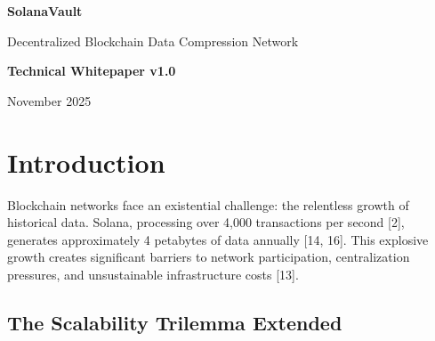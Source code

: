 \documentclass[12pt,a4paper]{article}
\begin{document}
\begin{titlepage}
\centering
\vspace*{2cm}
{\Huge\bfseries\color{vaultblue} SolanaVault\par}
\vspace{0.5cm}
{\Large Decentralized Blockchain Data Compression Network\par}
\vspace{2cm}
{\large\textbf{Technical Whitepaper v1.0}\par}
\vspace{1cm}
{\large November 2025\par}
\vspace{3cm}
\begin{abstract}
\noindent SolanaVault introduces a novel decentralized network architecture that combines advanced multi-stage compression algorithms with Byzantine Fault Tolerant consensus [4] to achieve 15-25:1 compression ratios on blockchain data. The protocol establishes a self-sustaining economic model through micro-token payments, enabling infrastructure operators to earn revenue while users benefit from dramatically reduced storage costs. This paper presents the technical architecture, tokenomics, and utility mechanisms that position SolanaVault as critical infrastructure for blockchain scalability.
\end{abstract}
\vfill
\end{titlepage}

\tableofcontents
\newpage

\section{Introduction}

Blockchain networks face an existential challenge: the relentless growth of historical data. Solana, processing over 4,000 transactions per second [2], generates approximately 4 petabytes of data annually [14, 16]. This explosive growth creates significant barriers to network participation, centralization pressures, and unsustainable infrastructure costs [13].

\subsection{The Scalability Trilemma Extended}
\end{document}
